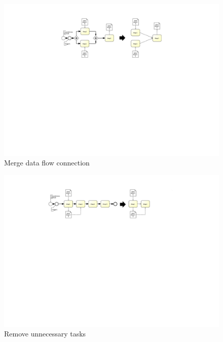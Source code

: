 \begin{figure}[h!]
	\includegraphics[width=14cm, trim={8.5cm 13.5cm 8.5cm 2.0cm}]{img/ExtractDFDGateWayMerge.pdf}
	\caption{Merge data flow connection}
	\label{fig:mergeDataFlow}
\end{figure}

\begin{figure}[h!]
	\includegraphics[width=\textwidth, trim={7.5cm 15.3cm 8.5cm 1.5cm}]{img/ExtractDFDRemove.pdf}
	\caption{Remove unnecessary tasks}
	\label{fig:removeDataFlow}
\end{figure}












